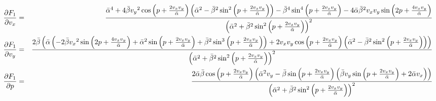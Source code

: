 \documentclass[reprint, aps, pre,nofootinbib]{revtex4-1}
\begin{document}
\begin{widetext}
{\scriptsize{}
\begin{eqnarray*}
\frac{\partial F_{1}}{\partial v_{x}} & = & \frac{\bar{\alpha}^{4}+4\bar{\beta}\text{\ensuremath{v_{y}}}^{2}\cos\left(p+\frac{2\text{\ensuremath{v_{x}}}\text{\ensuremath{v_{y}}}}{\bar{\alpha}}\right)\left(\bar{\alpha}^{2}-\bar{\beta}^{2}\sin^{2}\left(p+\frac{2\text{\ensuremath{v_{x}}}\text{\ensuremath{v_{y}}}}{\bar{\alpha}}\right)\right)-\bar{\beta}^{4}\sin^{4}\left(p+\frac{2\text{\ensuremath{v_{x}}}\text{\ensuremath{v_{y}}}}{\bar{\alpha}}\right)-4\bar{\alpha}\bar{\beta}^{2}\text{\ensuremath{v_{x}}}\text{\ensuremath{v_{y}}}\sin\left(2p+\frac{4\text{\ensuremath{v_{x}}}\text{\ensuremath{v_{y}}}}{\bar{\alpha}}\right)}{\left(\bar{\alpha}^{2}+\bar{\beta}^{2}\sin^{2}\left(p+\frac{2\text{\ensuremath{v_{x}}}\text{\ensuremath{v_{y}}}}{\bar{\alpha}}\right)\right)^{2}}\\
\frac{\partial F_{1}}{\partial v_{y}} & = & \frac{2\bar{\beta}\left(\bar{\alpha}\left(-2\bar{\beta}\text{\ensuremath{v_{x}}}^{2}\sin\left(2p+\frac{4\text{\ensuremath{v_{x}}}\text{\ensuremath{v_{y}}}}{\bar{\alpha}}\right)+\bar{\alpha}^{2}\sin\left(p+\frac{2\text{\ensuremath{v_{x}}}\text{\ensuremath{v_{y}}}}{\bar{\alpha}}\right)+\bar{\beta}^{2}\sin^{3}\left(p+\frac{2\text{\ensuremath{v_{x}}}\text{\ensuremath{v_{y}}}}{\bar{\alpha}}\right)\right)+2\text{\ensuremath{v_{x}}}\text{\ensuremath{v_{y}}}\cos\left(p+\frac{2\text{\ensuremath{v_{x}}}\text{\ensuremath{v_{y}}}}{\bar{\alpha}}\right)\left(\bar{\alpha}^{2}-\bar{\beta}^{2}\sin^{2}\left(p+\frac{2\text{\ensuremath{v_{x}}}\text{\ensuremath{v_{y}}}}{\bar{\alpha}}\right)\right)\right)}{\left(\bar{\alpha}^{2}+\bar{\beta}^{2}\sin^{2}\left(p+\frac{2\text{\ensuremath{v_{x}}}\text{\ensuremath{v_{y}}}}{\bar{\alpha}}\right)\right)^{2}}\\
\frac{\partial F_{1}}{\partial p} & = & \frac{2\bar{\alpha}\bar{\beta}\cos\left(p+\frac{2\text{\ensuremath{v_{x}}}\text{\ensuremath{v_{y}}}}{\bar{\alpha}}\right)\left(\bar{\alpha}^{2}\text{\ensuremath{v_{y}}}-\bar{\beta}\sin\left(p+\frac{2\text{\ensuremath{v_{x}}}\text{\ensuremath{v_{y}}}}{\bar{\alpha}}\right)\left(\bar{\beta}\text{\ensuremath{v_{y}}}\sin\left(p+\frac{2\text{\ensuremath{v_{x}}}\text{\ensuremath{v_{y}}}}{\bar{\alpha}}\right)+2\bar{\alpha}\text{\ensuremath{v_{x}}}\right)\right)}{\left(\bar{\alpha}^{2}+\bar{\beta}^{2}\sin^{2}\left(p+\frac{2\text{\ensuremath{v_{x}}}\text{\ensuremath{v_{y}}}}{\bar{\alpha}}\right)\right)^{2}}
\end{eqnarray*}
}{\scriptsize\par}


\end{widetext}
\end{document}
